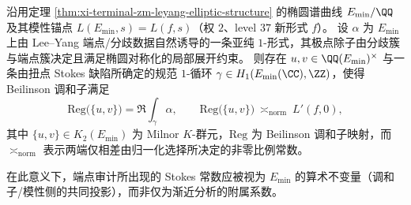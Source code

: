 \begin{conjecture}\label{conj:xi-leyang-elliptic-regulator-stokes-hub}
沿用定理 \ref{thm:xi-terminal-zm-leyang-elliptic-structure} 的椭圆谱曲线 \(E_{\min}/\QQ\) 及其模性锚点 \(L(E_{\min},s)=L(f,s)\)（权 \(2\)、level \(37\) 新形式 \(f\)）。
设 \(\alpha\) 为 \(E_{\min}\) 上由 Lee--Yang 端点/分歧数据自然诱导的一条亚纯 \(1\)-形式，其极点除子由分歧簇与端点簇决定且满足椭圆对称化的局部展开约束。
则存在 \(u,v\in\QQ(E_{\min})^\times\) 与一条由扭点 Stokes 缺陷所确定的规范 \(1\)-循环 \(\gamma\in H_1(E_{\min}(\CC),\ZZ)\)，使得 Beilinson 调和子满足
\[
\mathrm{Reg}\bigl(\{u,v\}\bigr)=\Re\int_{\gamma}\alpha,
\qquad
\mathrm{Reg}\bigl(\{u,v\}\bigr)\ \asymp_{\mathrm{norm}}\ L'(f,0),
\]
其中 \(\{u,v\}\in K_2(E_{\min})\) 为 Milnor \(K\)-群元，\(\mathrm{Reg}\) 为 Beilinson 调和子映射，而 \(\asymp_{\mathrm{norm}}\) 表示两端仅相差由归一化选择所决定的非零比例常数。
\par
在此意义下，端点审计所出现的 Stokes 常数应被视为 \(E_{\min}\) 的算术不变量（调和子/模性侧的共同投影），而非仅为渐近分析的附属系数。
\end{conjecture}

\endinput

